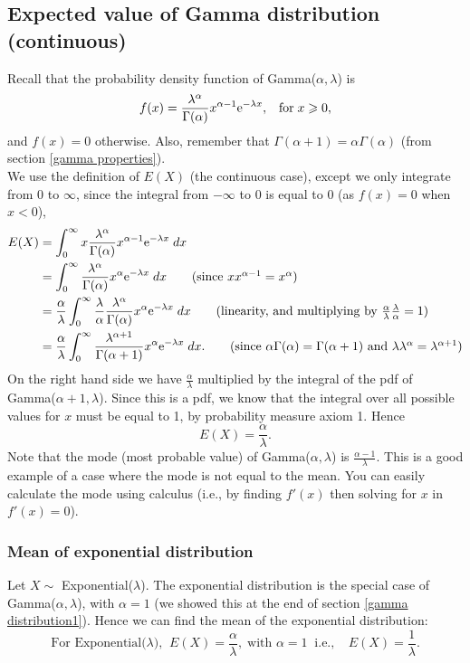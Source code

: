 \subsection{Expected value of Gamma distribution (continuous)} \label{meanGamma}
Recall that the probability density function of Gamma($\alpha,\lambda$) is
\[
f(x) = \frac{\lambda^\alpha}{\Gamma(\alpha)}x^{\alpha-1}\mathrm{e}^{-\lambda x}, \;\;\; \text{for} \; x \geqslant 0,
\]
and $f(x) = 0$ otherwise. Also, remember that $\Gamma(\alpha + 1) = \alpha\Gamma(\alpha)$ (from section \ref{gamma properties}). \\
We use the definition of $E(X)$ (the continuous case), except we only integrate from $0$ to $\infty$, since the integral from $-\infty$ to $0$ is equal to $0$ (as $f(x) = 0$ when $x < 0$),
\begin{align*}
E(X)  & = \int_0^\infty x \frac{\lambda^\alpha}{\Gamma(\alpha)}x^{\alpha-1}\e^{-\lambda x} \; dx \\
	& = \int_0^\infty \frac{\lambda^\alpha}{\Gamma(\alpha)}x^{\alpha}\e^{-\lambda x} \; dx \tag{since $xx^{\alpha - 1} = x^\alpha$} \\
	& = \frac{\alpha}{\lambda}  \int_0^\infty \frac{\lambda}{\alpha} \frac{\lambda^\alpha}{\Gamma(\alpha)}x^{\alpha}\e^{-\lambda x} \; dx \tag{linearity, and multiplying by $\frac{\alpha}{\lambda}\frac{\lambda}{\alpha} = 1$} \\
	& = \frac{\alpha}{\lambda}  \int_0^\infty \frac{\lambda^{\alpha+1}}{\Gamma(\alpha + 1)}x^{\alpha}\e^{-\lambda x} \; dx. \tag{since $\alpha\Gamma(\alpha) = \Gamma(\alpha + 1)$ and $\lambda \lambda^\alpha = \lambda^{\alpha+1}$}
\end{align*}
On the right hand side we have $\frac{\alpha}{\lambda}$ multiplied by the integral of the pdf of Gamma($\alpha+1,\lambda$). Since this is a pdf, we know that the integral over all possible values for $x$ must be equal to 1, by probability measure axiom 1. Hence
\[
E(X) = \frac{\alpha}{\lambda}.
\]
Note that the mode (most probable value) of Gamma($\alpha,\lambda$) is $\frac{\alpha-1}{\lambda}$. This is a good example of a case where the mode is not equal to the mean. You can easily calculate the mode using calculus (i.e., by finding $f'(x)$ then solving for $x$ in $f'(x) = 0$). \\

\subsubsection{Mean of exponential distribution}
\noindent Let $X \sim$ Exponential($\lambda$). The exponential distribution is the special case of Gamma($\alpha,\lambda$), with $\alpha = 1$ (we showed this at the end of section \ref{gamma distribution1}). Hence we can find the mean of the exponential distribution:
\[
\text{For Exponential($\lambda$),} \;\; E(X) = \frac{\alpha}{\lambda}, \; \text{with $\alpha = 1$} \;\; \text{i.e.,} \;\;\;\; E(X) = \frac{1}{\lambda}.
\]

